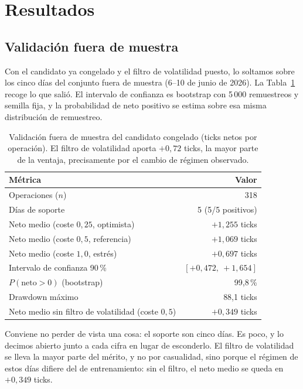 \documentclass[11pt,a4paper]{article}
\begin{document}
\section{Resultados}
\label{sec:resultados}

\subsection{Validación fuera de muestra}

Con el candidato ya congelado y el filtro de volatilidad puesto, lo soltamos sobre
los cinco días del conjunto fuera de muestra (6--10 de junio de 2026). La
Tabla~\ref{tab:fresh} recoge lo que salió. El intervalo de confianza es bootstrap
con 5\,000 remuestreos y semilla fija, y la probabilidad de neto positivo se estima
sobre esa misma distribución de remuestreo.

\begin{table}[H]
\centering
\small
\begin{tabular}{lr}
\toprule
\textbf{Métrica} & \textbf{Valor} \\
\midrule
Operaciones ($n$)                 & 318 \\
Días de soporte                   & 5 (5/5 positivos) \\
Neto medio (coste $0{,}25$, optimista)   & $+1{,}255$ ticks \\
Neto medio (coste $0{,}5$, referencia)    & $+1{,}069$ ticks \\
Neto medio (coste $1{,}0$, estrés)        & $+0{,}697$ ticks \\
Intervalo de confianza 90\,\%     & $[+0{,}472,\ +1{,}654]$ \\
$P(\text{neto} > 0)$ (bootstrap)  & 99,8\,\% \\
Drawdown máximo                   & 88,1 ticks \\
Neto medio sin filtro de volatilidad (coste $0{,}5$) & $+0{,}349$ ticks \\
\bottomrule
\end{tabular}
\caption{Validación fuera de muestra del candidato congelado (ticks netos por
operación). El filtro de volatilidad aporta $+0{,}72$ ticks, la mayor parte de la
ventaja, precisamente por el cambio de régimen observado.}
\label{tab:fresh}
\end{table}

Conviene no perder de vista una cosa: el soporte son cinco días. Es poco, y lo
decimos abierto junto a cada cifra en lugar de esconderlo. El filtro de volatilidad
se lleva la mayor parte del mérito, y no por casualidad, sino porque el régimen de
estos días difiere del de entrenamiento: sin el filtro, el neto medio se queda en
$+0{,}349$ ticks.
\end{document}
